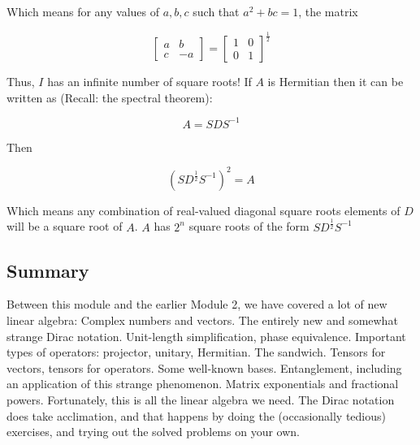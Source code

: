 \documentclass[main.tex]{subfiles}
\begin{document}
    Which means for any values of $a, b, c$ such that $a^{2}+b c=1$, the matrix
    
    $$
    \left[\begin{array}{cc}
    a & b \\
    c & -a
    \end{array}\right]=\left[\begin{array}{ll}
    1 & 0 \\
    0 & 1
    \end{array}\right]^{\frac{1}{2}}
    $$
    
    Thus, $I$ has an infinite number of square roots! If $A$ is Hermitian then it can be written as (Recall: the spectral theorem):
    
    $$
    A=S D S^{-1}
    $$
    
    Then
    
    $$
    \left(S D^{\frac{1}{2}} S^{-1}\right)^{2}=A
    $$
    
    Which means any combination of real-valued diagonal square roots elements of $D$ will be a square root of $A$. $A$ has $2^{n}$ square roots of the form $S D^{\frac{1}{2}} S^{-1}$

\subsection{Summary}

    Between this module and the earlier Module 2, we have covered a lot of new linear algebra: Complex numbers and vectors. The entirely new and somewhat strange Dirac notation. Unit-length simplification, phase equivalence. Important types of operators: projector, unitary, Hermitian. The sandwich. Tensors for vectors, tensors for operators. Some well-known bases. Entanglement, including an application of this strange phenomenon. Matrix exponentials and fractional powers. Fortunately, this is all the linear algebra we need. The Dirac notation does take acclimation, and that happens by doing the (occasionally tedious) exercises, and trying out the solved problems on your own.
\end{document}
